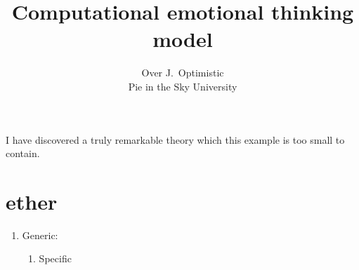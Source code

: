 \documentclass{apa6e}
\title{Computational emotional thinking model}
\author{Over J.~Optimistic\\Pie in the Sky University}
\begin{document}
\maketitle
I have discovered a truly remarkable theory which
this example is too small to contain.
\section{ether}
\begin{enumerate}
 \item Generic:
 \begin{enumerate}
  \item Specific
 \end{enumerate}
\end{enumerate}




\end{document}
